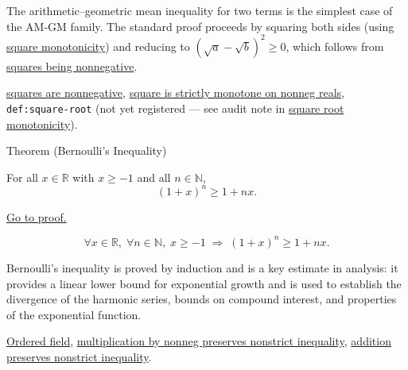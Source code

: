 \begin{remark*}[Interpretation]
The arithmetic--geometric mean inequality for two terms is the simplest
case of the AM-GM family.  The standard proof proceeds by squaring both
sides (using
\hyperref[thm:ineq-square-monotone]{square monotonicity}) and reducing
to $(\sqrt{a} - \sqrt{b})^2 \ge 0$, which follows from
\hyperref[thm:ordered-field-squares-nonnegative]{squares being nonnegative}.
\end{remark*}

\begin{dependencies}
\hyperref[thm:ordered-field-squares-nonnegative]{squares are nonnegative},
\hyperref[thm:ineq-square-monotone]{square is strictly monotone on nonneg reals},
\texttt{def:square-root} (not yet registered --- see audit note in
\hyperref[thm:ineq-square-root-monotone]{square root monotonicity}).
\end{dependencies}


\begin{theorembox}{Theorem (Bernoulli's Inequality)}
\begin{theorem}
\label{thm:ineq-bernoulli}
For all $x \in \mathbb{R}$ with $x \ge -1$ and all $n \in \mathbb{N}$,
\[
  (1 + x)^n \ge 1 + nx.
\]
\end{theorem}
\end{theorembox}



\begin{remark*}[Proof]
\hyperref[prf:ineq-bernoulli]{Go to proof.}
\end{remark*}

\begin{remark*}
\[
  \forall x \in \mathbb{R},\;
  \forall n \in \mathbb{N},\;
  x \ge -1 \;\Rightarrow\;
  (1 + x)^n \ge 1 + nx.
\]
\end{remark*}

\begin{remark*}[Interpretation]
Bernoulli's inequality is proved by induction and is a key estimate in
analysis: it provides a linear lower bound for exponential growth and
is used to establish the divergence of the harmonic series, bounds on
compound interest, and properties of the exponential function.
\end{remark*}

\begin{dependencies}
\hyperref[def:real-ordered-field]{Ordered field},
\hyperref[thm:ineq-nonstrict-multiply-nonneg]{multiplication by nonneg preserves nonstrict inequality},
\hyperref[thm:ineq-nonstrict-add-both-sides]{addition preserves nonstrict inequality}.
\end{dependencies}
